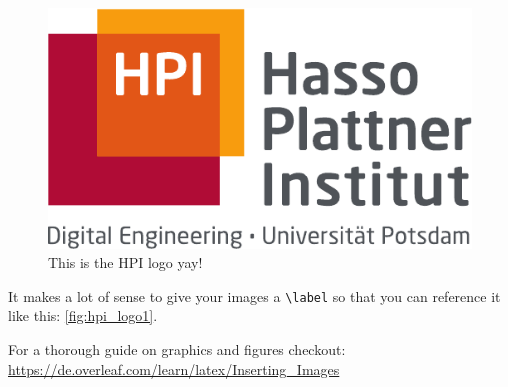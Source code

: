 \begin{figure}[H] %
    \centering
    \includegraphics{template/logo/hpi_logo.pdf}
    \caption{This is the HPI logo yay!}
    \label{fig:hpi_logo1}
\end{figure}

It makes a lot of sense to give your images a \verb|\label| so that you can reference it like this: \autoref{fig:hpi_logo1}.


For a thorough guide on graphics and figures checkout: \url{https://de.overleaf.com/learn/latex/Inserting_Images}
